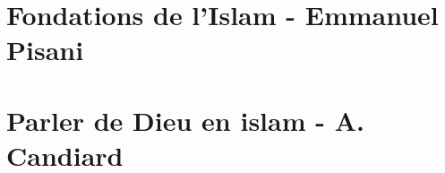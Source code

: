 \documentclass[oneside,10pt]{book}
\begin{document}
 







\setcounter{page}{1}
 



%
%

% 
%
%
%

%
%

% 
 
 
\part{Fondations de l'Islam - Emmanuel Pisani}
 
\FloatBarrier







%
%
\part{Parler de Dieu en islam - A. Candiard}
 
 
 
 
  
  
  
  
 
\end{document}
